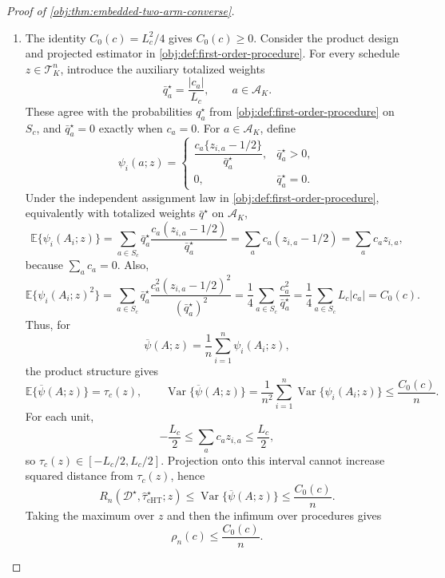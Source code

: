 \begin{proof}[Proof of \cref{obj:thm:embedded-two-arm-converse}]
\begin{enumerate}
\item The identity \(C_0(c)=L_c^2/4\) gives \(C_0(c)\ge0\). Consider the product design and projected estimator in \cref{obj:def:first-order-procedure}. For every schedule \(z\in\mathcal T_K^n\), introduce the auxiliary totalized weights
\[
\bar q_a^\star=\frac{|c_a|}{L_c},
\qquad a\in\mathcal A_K.
\]
These agree with the probabilities \(q_a^\star\) from \cref{obj:def:first-order-procedure} on \(S_c\), and \(\bar q_a^\star=0\) exactly when \(c_a=0\). For \(a\in\mathcal A_K\), define
\[
\psi_i(a;z)
=
\begin{cases}
\dfrac{c_a\{z_{i,a}-1/2\}}{\bar q_a^\star},&\bar q_a^\star>0,\\[1.2ex]
0,&\bar q_a^\star=0.
\end{cases}
\]
Under the independent assignment law in \cref{obj:def:first-order-procedure}, equivalently with totalized weights \(\bar q^\star\) on \(\mathcal A_K\),
\[
\mathbb E\{\psi_i(A_i;z)\}
=
\sum_{a\in S_c} \bar q_a^\star
\frac{c_a(z_{i,a}-1/2)}{\bar q_a^\star}
=
\sum_a c_a(z_{i,a}-1/2)
=
\sum_a c_az_{i,a},
\]
because \(\sum_a c_a=0\). Also,
\[
\mathbb E\{\psi_i(A_i;z)^2\}
=
\sum_{a\in S_c}
\bar q_a^\star
\frac{c_a^2(z_{i,a}-1/2)^2}{(\bar q_a^\star)^2}
=
\frac14\sum_{a\in S_c}\frac{c_a^2}{\bar q_a^\star}
=
\frac14\sum_{a\in S_c}L_c|c_a|
=
C_0(c).
\]
Thus, for
\[
\overline\psi(A;z)=\frac1n\sum_{i=1}^n\psi_i(A_i;z),
\]
the product structure gives
\[
\mathbb E\{\overline\psi(A;z)\}=\tau_c(z),
\qquad
\operatorname{Var}\{\overline\psi(A;z)\}
=
\frac1{n^2}\sum_{i=1}^n\operatorname{Var}\{\psi_i(A_i;z)\}
\le
\frac{C_0(c)}{n}.
\]
For each unit,
\[
-\frac{L_c}{2}\le \sum_a c_a z_{i,a}\le \frac{L_c}{2},
\]
so \(\tau_c(z)\in[-L_c/2,L_c/2]\). Projection onto this interval cannot increase squared distance from \(\tau_c(z)\), hence
\[
R_n(\mathcal D^\star,\widehat\tau_{\mathrm{cHT}}^\star;z)
\le
\operatorname{Var}\{\overline\psi(A;z)\}
\le
\frac{C_0(c)}{n}.
\]
Taking the maximum over \(z\) and then the infimum over procedures gives
\[
\rho_n(c)\le \frac{C_0(c)}{n}.
\]


\end{enumerate}
\end{proof}
